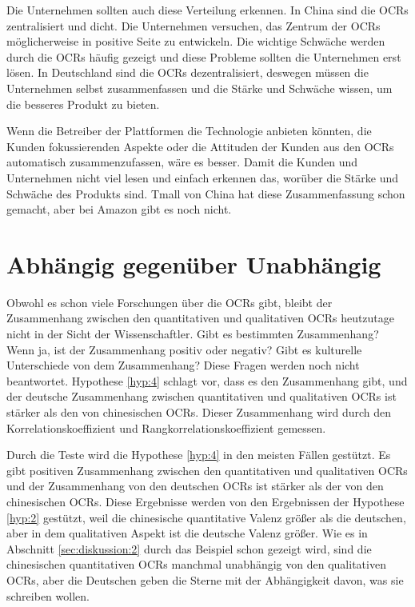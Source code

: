Die Unternehmen sollten auch diese Verteilung erkennen. In China sind die \ac{OCRs} zentralisiert und dicht. Die Unternehmen versuchen, das Zentrum der \ac{OCRs} möglicherweise in positive Seite zu entwickeln. Die wichtige Schwäche werden durch die \ac{OCRs} häufig gezeigt und diese Probleme sollten die Unternehmen erst lösen. In Deutschland sind die \ac{OCRs} dezentralisiert, deswegen müssen die Unternehmen selbst zusammenfassen und die Stärke und Schwäche wissen, um die besseres Produkt zu bieten.

Wenn die Betreiber der Plattformen die Technologie anbieten könnten, die Kunden fokussierenden Aspekte oder die Attituden der Kunden aus den \ac{OCRs} automatisch zusammenzufassen, wäre es besser. Damit die Kunden und Unternehmen nicht viel lesen und einfach erkennen das, worüber die Stärke und Schwäche des Produkts sind. Tmall von China hat diese Zusammenfassung schon gemacht, aber bei Amazon gibt es noch nicht.
\section{Abhängig gegenüber Unabhängig}
Obwohl es schon viele Forschungen über die \ac{OCRs} gibt, bleibt der Zusammenhang zwischen den quantitativen und qualitativen \ac{OCRs} heutzutage nicht in der Sicht der Wissenschaftler. Gibt es bestimmten Zusammenhang? Wenn ja, ist der Zusammenhang positiv oder negativ? Gibt es kulturelle Unterschiede von dem Zusammenhang? Diese Fragen werden noch nicht beantwortet. Hypothese \ref{hyp:4} schlagt vor, dass es den Zusammenhang gibt, und der deutsche Zusammenhang zwischen quantitativen und qualitativen \ac{OCRs} ist stärker als den von chinesischen \ac{OCRs}. Dieser Zusammenhang wird durch den Korrelationskoeffizient und Rangkorrelationskoeffizient gemessen.

Durch die Teste wird die Hypothese \ref{hyp:4} in den meisten Fällen gestützt. Es gibt positiven Zusammenhang zwischen den quantitativen und qualitativen \ac{OCRs} und der Zusammenhang von den deutschen \ac{OCRs} ist stärker als der von den chinesischen \ac{OCRs}. Diese Ergebnisse werden von den Ergebnissen der Hypothese \ref{hyp:2} gestützt, weil die chinesische quantitative Valenz größer als die deutschen, aber in dem qualitativen Aspekt ist die deutsche Valenz größer. Wie es in Abschnitt \ref{sec:diskussion:2} durch das Beispiel schon gezeigt wird, sind die chinesischen quantitativen \ac{OCRs} manchmal unabhängig von den qualitativen \ac{OCRs}, aber die Deutschen geben die Sterne mit der Abhängigkeit davon, was sie schreiben wollen.

